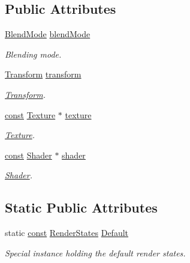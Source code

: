 \subsection*{Public Attributes}
\begin{DoxyCompactItemize}
\item 
\hyperlink{structsf_1_1_blend_mode}{Blend\-Mode} \hyperlink{classsf_1_1_render_states_ad6ac87f1b5006dae7ebfee4b5d40f5a8}{blend\-Mode}
\begin{DoxyCompactList}\small\item\em Blending mode. \end{DoxyCompactList}\item 
\hyperlink{classsf_1_1_transform}{Transform} \hyperlink{classsf_1_1_render_states_a1f737981a0f2f0d4bb8dac866a8d1149}{transform}
\begin{DoxyCompactList}\small\item\em \hyperlink{classsf_1_1_transform}{Transform}. \end{DoxyCompactList}\item 
\hyperlink{term__entry_8h_a57bd63ce7f9a353488880e3de6692d5a}{const} \hyperlink{classsf_1_1_texture}{Texture} $\ast$ \hyperlink{classsf_1_1_render_states_ad7eb50453917561fa7a9df7f4c53f1fd}{texture}
\begin{DoxyCompactList}\small\item\em \hyperlink{classsf_1_1_texture}{Texture}. \end{DoxyCompactList}\item 
\hyperlink{term__entry_8h_a57bd63ce7f9a353488880e3de6692d5a}{const} \hyperlink{classsf_1_1_shader}{Shader} $\ast$ \hyperlink{classsf_1_1_render_states_a30e00c9f28ca246ae73119975255ebd0}{shader}
\begin{DoxyCompactList}\small\item\em \hyperlink{classsf_1_1_shader}{Shader}. \end{DoxyCompactList}\end{DoxyCompactItemize}
\subsection*{Static Public Attributes}
\begin{DoxyCompactItemize}
\item 
static \hyperlink{term__entry_8h_a57bd63ce7f9a353488880e3de6692d5a}{const} \hyperlink{classsf_1_1_render_states}{Render\-States} \hyperlink{classsf_1_1_render_states_afa30e6d780c05c2a20587ddb01b5fa5c}{Default}
\begin{DoxyCompactList}\small\item\em Special instance holding the default render states. \end{DoxyCompactList}\end{DoxyCompactItemize}


